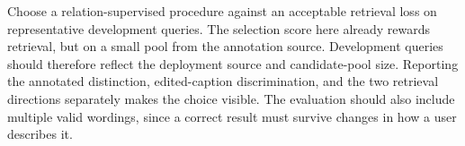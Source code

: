Choose a relation-supervised procedure against an acceptable retrieval loss on representative development queries. The selection score here already rewards retrieval, but on a small pool from the annotation source. Development queries should therefore reflect the deployment source and candidate-pool size. Reporting the annotated distinction, edited-caption discrimination, and the two retrieval directions separately makes the choice visible. The evaluation should also include multiple valid wordings, since a correct result must survive changes in how a user describes it.
